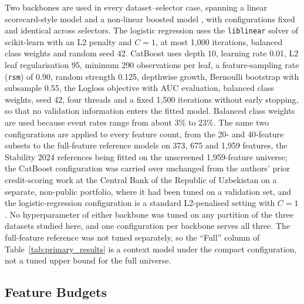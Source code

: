 \documentclass[final,5p,twocolumn]{elsarticle}
\begin{document}
Two backbones are used in every dataset--selector case, spanning a linear scorecard-style model and a non-linear boosted model \cite{lessmann2015,gunnarsson2021}, with configurations fixed and identical across selectors. The logistic regression uses the \texttt{liblinear} solver of scikit-learn \cite{pedregosa2011} with an L2 penalty and $C=1$, at most 1,000 iterations, balanced class weights and random seed 42. CatBoost \cite{prokhorenkova2018} uses depth 10, learning rate 0.01, L2 leaf regularisation 95, minimum 290 observations per leaf, a feature-sampling rate (\texttt{rsm}) of 0.90, random strength 0.125, depthwise growth, Bernoulli bootstrap with subsample 0.55, the Logloss objective with AUC evaluation, balanced class weights, seed 42, four threads and a fixed 1,500 iterations without early stopping, so that no validation information enters the fitted model. Balanced class weights are used because event rates range from about 3\% to 23\%. The same two configurations are applied to every feature count, from the 20- and 40-feature subsets to the full-feature reference models on 373, 675 and 1,959 features, the Stability 2024 references being fitted on the unscreened 1,959-feature universe; the CatBoost configuration was carried over unchanged from the authors' prior credit-scoring work at the Central Bank of the Republic of Uzbekistan on a separate, non-public portfolio, where it had been tuned on a validation set, and the logistic-regression configuration is a standard L2-penalised setting with $C=1$. No hyperparameter of either backbone was tuned on any partition of the three datasets studied here, and one configuration per backbone serves all three. The full-feature reference was not tuned separately, so the ``Full'' column of Table~\ref{tab:primary_results} is a context model under the compact configuration, not a tuned upper bound for the full universe.

\subsection{Feature Budgets}
\label{subsec:feature_budgets}
\end{document}

